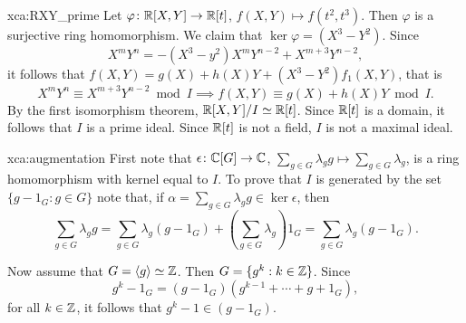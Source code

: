 \begin{sol}{xca:RXY_prime}
	Let $\varphi\colon\mathbb{R}[X,Y]\to\mathbb{R}[t]$, $f(X,Y)\mapsto f(t^2,t^3)$. 
	Then $\varphi$ is a surjective ring homomorphism. We claim that
	$\ker\varphi=(X^3-Y^2)$. Since 
	\[
		X^mY^n=-(X^3-y^2)X^mY^{n-2}+X^{m+3}Y^{n-2}, 
	\]
	it follows
	that $f(X,Y)=g(X)+h(X)Y+(X^3-Y^2)f_1(X,Y)$, that is 
	\[
	X^mY^n\equiv X^{m+3}Y^{n-2}\bmod I
	\implies
	f(X,Y)\equiv g(X)+h(X)Y\bmod I.
	\]
	By the first isomorphism theorem, $\mathbb{R}[X,Y]/I\simeq\mathbb{R}[t]$. Since $\mathbb{R}[t]$ is
	a domain, it follows that $I$ is a prime ideal. Since $\mathbb{R}[t]$ is not a
	field, $I$ is not a maximal ideal.
\end{sol}

\begin{sol}{xca:augmentation}
	First note that $\epsilon\colon\mathbb{C}[G]\to\mathbb{C}$, $\sum_{g\in G}\lambda_gg\mapsto \sum_{g\in G}\lambda_g$, 
	is a ring homomorphism with kernel equal to $I$. To prove
	that $I$ is generated by the set $\{g-1_G:g\in G\}$ note that, 
	if $\alpha=\sum_{g\in G}\lambda_gg\in \ker\epsilon$, then 
	\[
		\sum_{g\in G}\lambda_gg=\sum_{g\in G}\lambda_g(g-1_G)+\left(\sum_{g\in G}\lambda_g\right)1_G
		=\sum_{g\in G}\lambda_g(g-1_G).
	\]
	
	Now assume that $G=\langle g\rangle\simeq\mathbb{Z}$. Then $G=\{g^k:k\in\mathbb{Z}\}$. 
	Since 
	\[
		g^k-1_G=(g-1_G)(g^{k-1}+\cdots+g+1_G),
	\]
	for all $k\in\mathbb{Z}$, it follows that $g^k-1\in (g-1_G)$. 
\end{sol}
